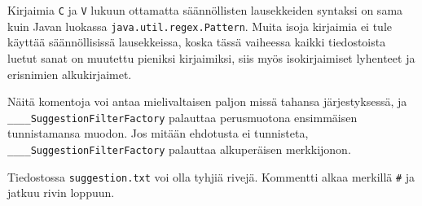 \documentclass[12pt,a4paper]{scrartcl}
\begin{document}
Kirjaimia \verb|C| ja \verb|V| lukuun ottamatta säännöllisten
lausekkeiden syntaksi on sama kuin Javan luokassa
\verb=java.util.regex.Pattern=. Muita isoja kirjaimia ei tule
käyttää säännöllisissä lausekkeissa, koska tässä vaiheessa kaikki
tiedostoista luetut sanat on muutettu pieniksi kirjaimiksi, siis myös
isokirjaimiset lyhenteet ja erisnimien alkukirjaimet.

\bigskip
Näitä komentoja voi antaa mielivaltaisen paljon missä tahansa
järjestyksessä, ja \\ \verb|____SuggestionFilterFactory| palauttaa
perusmuotona ensimmäisen tunnistamansa muodon. Jos mitään ehdotusta ei
tunnisteta, \verb|____SuggestionFilterFactory| palauttaa alkuperäisen
merkkijonon.

Tiedostossa \verb|suggestion.txt| voi olla tyhjiä rivejä. Kommentti
alkaa merkillä \verb|#| ja jatkuu rivin loppuun.
\end{document}
